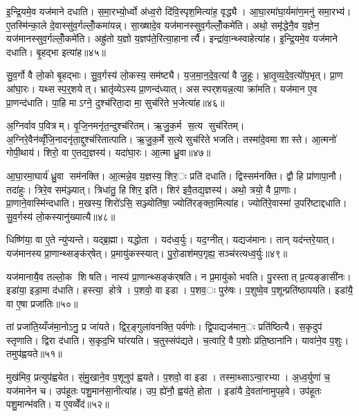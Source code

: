 इ॒न्द्रि॒यमे॒व यज॑माने दधाति। स॒मा॒रभ्यो॒र्ध्वो अ॑ध्व॒रो दि॑वि॒स्पृश॒मित्या॑ह॒ वृद्ध्यै। आ॒घा॒रमा॑घा॒र्यमा॑ण॒मनु॑ समा॒रभ्य॑। ए॒तस्मि॑न्का॒ले दे॒वास्सु॑व॒र्गल्लोँ॒कमा॑यन्न्। सा॒ख्षादे॒व यज॑मानस्सुव॒र्गल्लोँ॒कमे॑ति। अथो॒ समृ॑द्धेनै॒व य॒ज्ञेन॒ यज॑मानस्सुव॒र्गल्लोँ॒कमे॑ति। अह्रु॑तो य॒ज्ञो य॒ज्ञप॑ते॒रित्या॒हानार्त्यै। इन्द्रा॑वा॒न्थ्स्वाहेत्या॑ह। इ॒न्द्रि॒यमे॒व यज॑माने दधाति। बृ॒हद्भा इत्या॑ह॥४५॥

सु॒व॒र्गो वै लो॒को बृ॒हद्भाः। सु॒व॒र्गस्य॑ लो॒कस्य॒ सम॑ष्ट्यै। य॒ज॒मा॒न॒दे॒व॒त्या॑ वै जु॒हूः। भ्रा॒तृ॒व्य॒दे॒व॒त्यो॑प॒भृत्। प्रा॒ण आ॑घा॒रः। यथ्सस्प॒र्॒शयेत्। भ्रातृ॑व्येऽस्य प्रा॒णन्द॑ध्यात्। असस्पर्‌शयन्न॒त्या क्रा॑मति। यज॑मान ए॒व प्रा॒णन्द॑धाति। पा॒हि माऽग्ने॒ दुश्च॑रिता॒दा मा॒ सुच॑रिते भ॒जेत्या॑ह॥४६॥

अ॒ग्निर्वाव प॒वित्रम्। वृ॒जि॒नमनृ॑त॒न्दुश्च॑रितम्। ऋ॒जु॒क॒र्म स॒त्य सुच॑रितम्। अ॒ग्निरे॒वैन॑व्वृँजि॒नादनृ॑ता॒द्दुश्च॑रितात्पाति। ऋ॒जु॒क॒र्मे स॒त्ये सुच॑रिते भजति। तस्मा॑दे॒वमा शास्ते। आ॒त्मनो॑ गोपी॒थाय॑। शिरो॒ वा ए॒तद्य॒ज्ञस्य॑। यदा॑घा॒रः। आ॒त्मा ध्रु॒वा॥४७॥

आ॒घा॒रमा॒घार्य॑ ध्रु॒वा सम॑नक्ति। आ॒त्मन्ने॒व य॒ज्ञस्य॒ शिर॒ः प्रति॑ दधाति। द्विस्सम॑नक्ति। द्वौ हि प्रा॑णापा॒नौ। तदा॑हुः। त्रिरे॒व सम॑ञ्ज्यात्। त्रिधा॑तु॒ हि शिर॒ इति॑। शिर॑ इवै॒तद्य॒ज्ञस्य॑। अथो॒ त्रयो॒ वै प्रा॒णाः। प्रा॒णाने॒वास्मि॑न्दधाति। म॒खस्य॒ शिरो॑ऽसि॒ सञ्ज्योति॑षा॒ ज्योति॑रङ्क्ता॒मित्या॑ह। ज्योति॑रे॒वास्मा॑ उ॒परि॑ष्टाद्दधाति। सु॒व॒र्गस्य॑ लो॒कस्यानु॑ख्यात्यै॥४८॥


धिष्णि॑या॒ वा ए॒ते न्यु॑प्यन्ते। यद्ब्र॒ह्मा। यद्धोता। यद॑ध्व॒र्युः। यद॒ग्नीत्। यद्यज॑मानः। तान् यद॑न्तरे॒यात्। यज॑मानस्य प्रा॒णान्थ्सङ्क॑र्‌षेत्। प्र॒मायु॑कस्स्यात्। पु॒रो॒डाश॑मप॒गृह्य॒ सञ्च॑रत्यध्व॒र्युः॥४९॥

यज॑मानायै॒व तल्लो॒क शिषति। नास्य॑ प्रा॒णान्थ्सङ्क॑र्‌षति। न प्र॒मायु॑को भवति। पु॒रस्तात् प्र॒त्यङ्ङासी॑नः। इडा॑या॒ इडा॒मा द॑धाति। हस्त्या॒ होत्रे। प॒शवो॒ वा इडा। प॒शव॒ः पुरु॑षः। प॒शुष्वे॒व प॒शून्प्रति॑ष्ठापयति। इडा॑यै॒ वा ए॒षा प्रजा॑तिः॥५०॥

तां प्रजा॑ति॒य्यँज॑मा॒नोऽनु॒ प्र जा॑यते। द्विर॒ङ्गुला॑वनक्ति॒ पर्व॑णोः। द्वि॒पाद्यज॑मान॒ः प्रति॑ष्ठित्यै। स॒कृदुप॑ स्तृणाति। द्विरा द॑धाति। स॒कृद॒भि घा॑रयति। च॒तुस्संप॑द्यते। च॒त्वारि॒ वै प॒शोः प्र॑ति॒ष्ठाना॑नि। यावा॑ने॒व प॒शुः। तमुप॑ह्वयते॥५१॥

मुख॑मिव॒ प्रत्युप॑ह्वयेत। सं॒मु॒खाने॒व प॒शूनुप॑ ह्वयते। प॒शवो॒ वा इडा। तस्मा॒थ्साऽन्वा॒रभ्या। अ॒ध्व॒र्युणा॑ च॒ यज॑मानेन च। उप॑हूतः पशु॒मान॑सा॒नीत्या॑ह। उप॒ ह्ये॑नौ॒ ह्वय॑ते॒ होता। इडा॑यै दे॒वता॑नामुपह॒वे। उप॑हूतः पशु॒मान्भ॑वति। य ए॒वव्वेँद॑॥५२॥

